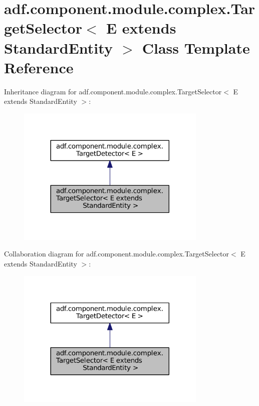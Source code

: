\hypertarget{classadf_1_1component_1_1module_1_1complex_1_1TargetSelector}{}\section{adf.\+component.\+module.\+complex.\+Target\+Selector$<$ E extends Standard\+Entity $>$ Class Template Reference}
\label{classadf_1_1component_1_1module_1_1complex_1_1TargetSelector}


Inheritance diagram for adf.\+component.\+module.\+complex.\+Target\+Selector$<$ E extends Standard\+Entity $>$\+:
\nopagebreak
\begin{figure}[H]
\begin{center}
\leavevmode
\includegraphics[width=257pt]{classadf_1_1component_1_1module_1_1complex_1_1TargetSelector__inherit__graph}
\end{center}
\end{figure}


Collaboration diagram for adf.\+component.\+module.\+complex.\+Target\+Selector$<$ E extends Standard\+Entity $>$\+:
\nopagebreak
\begin{figure}[H]
\begin{center}
\leavevmode
\includegraphics[width=257pt]{classadf_1_1component_1_1module_1_1complex_1_1TargetSelector__coll__graph}
\end{center}
\end{figure}
